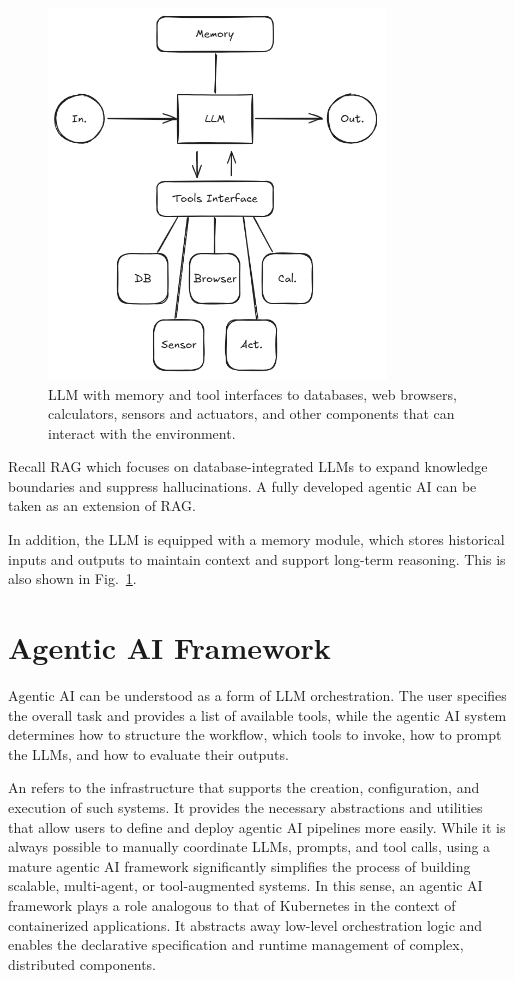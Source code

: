 \begin{figure}[!htb]
	\centering
	\includegraphics[width=0.8\textwidth]{./chapters/part-7/figures/agenticaiworkflow3.png}
	\caption{LLM with memory and tool interfaces to databases, web browsers, calculators, sensors and actuators, and other components that can interact with the environment.}
	\label{fig:agenticwf3}
\end{figure}

Recall RAG which focuses on database-integrated LLMs to expand knowledge boundaries and suppress hallucinations. A fully developed agentic AI can be taken as an extension of RAG.

In addition, the LLM is equipped with a memory module, which stores historical inputs and outputs to maintain context and support long-term reasoning. This is also shown in Fig.~\ref{fig:agenticwf3}.

\section{Agentic AI Framework}

Agentic AI can be understood as a form of LLM orchestration. The user specifies the overall task and provides a list of available tools, while the agentic AI system determines how to structure the workflow, which tools to invoke, how to prompt the LLMs, and how to evaluate their outputs.

An  refers to the infrastructure that supports the creation, configuration, and execution of such systems. It provides the necessary abstractions and utilities that allow users to define and deploy agentic AI pipelines more easily. While it is always possible to manually coordinate LLMs, prompts, and tool calls, using a mature agentic AI framework significantly simplifies the process of building scalable, multi-agent, or tool-augmented systems. In this sense, an agentic AI framework plays a role analogous to that of Kubernetes in the context of containerized applications. It abstracts away low-level orchestration logic and enables the declarative specification and runtime management of complex, distributed components. 

